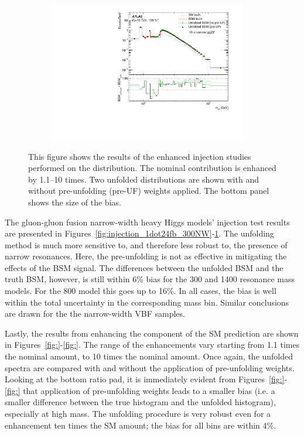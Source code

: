 \begin{figure}[h!]
    \begin{subfigure}{.43\textwidth}\centering\includegraphics[width = 0.95\textwidth]{Figures/m4l/InjectionTests/10xggllll_injection.pdf}\caption{}\label{fig:injection_0dot19fb_1400NW}\end{subfigure}
    \caption{This figure shows the results of the enhanced \ggZZ{} injection studies performed on the \mFourL{} distribution. The nominal \ggZZ{} contribution is enhanced by 1.1--10 times. Two unfolded distributions are shown with and without pre-unfolding (pre-UF) weights applied. The bottom panel shows the size of the bias.}
    \label{fig:m4l:injection}
\end{figure}

The gluon-gluon fusion narrow-width heavy Higgs models' injection test results are presented in Figures~\ref{fig:injection_1dot24fb_300NW}-\ref{fig:injection_0dot19fb_1400NW}. The unfolding method is much more sensitive to, and therefore less robust to, the presence of narrow resonances. Here, the pre-unfolding is not as effective in mitigating the effects of the BSM signal. The differences between the unfolded BSM and the truth BSM, however, is still within 6\% bias for the \unit{300}{\GeV} and \unit{1400}{\GeV} resonance mass models. For the \unit{800}{\GeV} model this goes up to 16\%. In all cases, the bias is well within the total uncertainty in the corresponding \mFourL{} mass bin. Similar conclusions are drawn for the the narrow-width VBF samples. 

Lastly, the results from enhancing the \ggZZ{} component of the SM prediction are shown in Figures~\ref{fig:}-\ref{fig:}. The range of the enhancements vary starting from 1.1 times the nominal amount, to 10 times the nominal amount. Once again, the unfolded spectra are compared with and without the application of pre-unfolding weights. Looking at the bottom ratio pad, it is immediately evident from Figures~\ref{fig:}-\ref{fig:} that application of pre-unfolding weights leads to a smaller bias (i.e. a smaller difference between the true histogram and the unfolded histogram), especially at high mass. The unfolding procedure is very robust even for a \ggZZ{} enhancement ten times the SM amount; the bias for all bins are within 4\%.